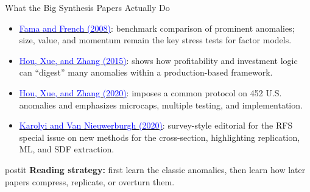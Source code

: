 \documentclass{beamer}
\begin{document}
\begin{frame}{What the Big Synthesis Papers Actually Do}
	\begin{itemize}
		\item \href{https://doi.org/10.1111/j.1540-6261.2008.01371.x}{\textcolor{blue}{Fama and French (2008)}}: benchmark comparison of prominent anomalies; size, value, and momentum remain the key stress tests for factor models.
		\item \href{https://doi.org/10.1093/rfs/hhu068}{\textcolor{blue}{Hou, Xue, and Zhang (2015)}}: shows how profitability and investment logic can ``digest'' many anomalies within a production-based framework.
		\item \href{https://doi.org/10.1093/rfs/hhy131}{\textcolor{blue}{Hou, Xue, and Zhang (2020)}}: imposes a common protocol on 452 U.S. anomalies and emphasizes microcaps, multiple testing, and implementation.
		\item \href{https://doi.org/10.1093/rfs/hhaa019}{\textcolor{blue}{Karolyi and Van Nieuwerburgh (2020)}}: survey-style editorial for the RFS special issue on new methods for the cross-section, highlighting replication, ML, and SDF extraction.
	\end{itemize}

	\vspace{0.3cm}
	\begin{beamercolorbox}[sep=0.4em,wd=\linewidth,rounded=true,shadow=true]{postit}
		\textbf{Reading strategy:} first learn the classic anomalies, then learn how later papers compress, replicate, or overturn them.
	\end{beamercolorbox}
\end{frame}
\end{document}
